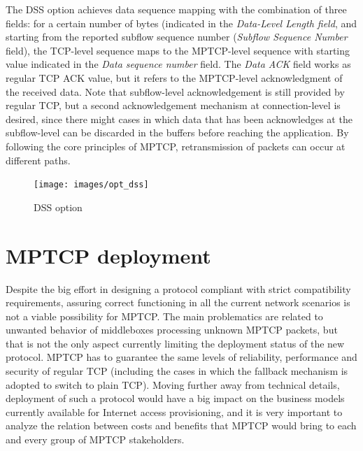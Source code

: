 The DSS option achieves data sequence mapping with the combination of three fields: for a certain number of bytes (indicated in the \textit{Data-Level Length field}, and starting from the reported subflow sequence number (\textit{Subflow Sequence Number} field), the TCP-level sequence maps to the MPTCP-level sequence with starting value indicated in the \textit{Data sequence number} field.
The \textit{Data ACK} field works as regular TCP ACK value, but it refers to the MPTCP-level acknowledgment of the received data. Note that subflow-level acknowledgement is still provided by regular TCP, but a second acknowledgement mechanism at connection-level is desired, since there might cases in which data that has been acknowledges at the subflow-level can be discarded in the buffers before reaching the application. By following the core principles of MPTCP, retransmission of packets can occur at different paths.

\begin{figure}[!htb]
\centering
\texttt{[image: images/opt\_dss]}
\caption{DSS option}
\label{fig:opt_dss}
\end{figure}

\section{MPTCP deployment}
Despite the big effort in designing a protocol compliant with strict compatibility requirements, assuring correct functioning in all the current network scenarios is not a viable possibility for MPTCP. The main problematics are related to unwanted behavior of middleboxes processing unknown MPTCP packets, but that is not the only aspect currently limiting the deployment status of the new protocol. MPTCP has to guarantee the same levels of reliability, performance and security of regular TCP (including the cases in which the fallback mechanism is adopted to switch to plain TCP). Moving further away from technical details, deployment of such a protocol would have a big impact on the business models currently available for Internet access provisioning, and it is very important to analyze the relation between costs and benefits that MPTCP would bring to each and every group of MPTCP stakeholders.


